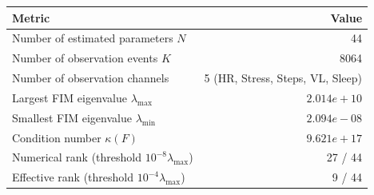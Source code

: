 \begin{tabular}{lr}
\toprule
Metric & Value \\
\midrule
Number of estimated parameters $N$ & 44 \\
Number of observation events $K$ & 8064 \\
Number of observation channels & 5 (HR, Stress, Steps, VL, Sleep) \\
Largest FIM eigenvalue $\lambda_{\max}$ & $2.014e+10$ \\
Smallest FIM eigenvalue $\lambda_{\min}$ & $2.094e-08$ \\
Condition number $\kappa(F)$ & $9.621e+17$ \\
Numerical rank (threshold $10^{-8} \lambda_{\max}$) & 27 / 44 \\
Effective rank (threshold $10^{-4} \lambda_{\max}$) & 9 / 44 \\
\bottomrule
\end{tabular}